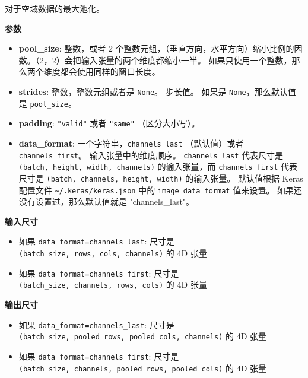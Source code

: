 对于空域数据的最大池化。

\textbf{参数}

\begin{itemize}
\tightlist
\item
  \textbf{pool\_size}: 整数，或者 2
  个整数元组，（垂直方向，水平方向）缩小比例的因数。（2，2）会把输入张量的两个维度都缩小一半。
  如果只使用一个整数，那么两个维度都会使用同样的窗口长度。
\item
  \textbf{strides}: 整数，整数元组或者是 \texttt{None}。 步长值。 如果是
  \texttt{None}，那么默认值是 \texttt{pool\_size}。
\item
  \textbf{padding}: \texttt{"valid"} 或者 \texttt{"same"}
  （区分大小写）。
\item
  \textbf{data\_format}: 一个字符串，\texttt{channels\_last}
  （默认值）或者 \texttt{channels\_first}。 输入张量中的维度顺序。
  \texttt{channels\_last} 代表尺寸是
  \texttt{(batch,\ height,\ width,\ channels)} 的输入张量，而
  \texttt{channels\_first} 代表尺寸是
  \texttt{(batch,\ channels,\ height,\ width)} 的输入张量。 默认值根据
  Keras 配置文件 \texttt{\textasciitilde{}/.keras/keras.json} 中的
  \texttt{image\_data\_format} 值来设置。
  如果还没有设置过，那么默认值就是 "channels\_last"。
\end{itemize}

\textbf{输入尺寸}

\begin{itemize}
\tightlist
\item
  如果
  \texttt{data\_format=\textquotesingle{}channels\_last\textquotesingle{}}:
  尺寸是 \texttt{(batch\_size,\ rows,\ cols,\ channels)} 的 4D 张量
\item
  如果
  \texttt{data\_format=\textquotesingle{}channels\_first\textquotesingle{}}:
  尺寸是 \texttt{(batch\_size,\ channels,\ rows,\ cols)} 的 4D 张量
\end{itemize}

\textbf{输出尺寸}

\begin{itemize}
\tightlist
\item
  如果
  \texttt{data\_format=\textquotesingle{}channels\_last\textquotesingle{}}:
  尺寸是 \texttt{(batch\_size,\ pooled\_rows,\ pooled\_cols,\ channels)}
  的 4D 张量
\item
  如果
  \texttt{data\_format=\textquotesingle{}channels\_first\textquotesingle{}}:
  尺寸是 \texttt{(batch\_size,\ channels,\ pooled\_rows,\ pooled\_cols)}
  的 4D 张量
\end{itemize}




